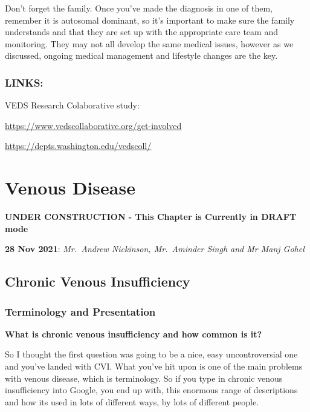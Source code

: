 \documentclass[
]{book}
\begin{document}
Don't forget the family. Once you've made the diagnosis in one of them,
remember it is autosomal dominant, so it's important to make sure the
family understands and that they are set up with the appropriate care
team and monitoring. They may not all develop the same medical issues,
however as we discussed, ongoing medical management and lifestyle
changes are the key.

\hypertarget{links}{%
\subsection{LINKS:}\label{links}}

VEDS Research Colaborative study:

\href{https://www.vedscollaborative.org/get-involved}{\uline{https://www.vedscollaborative.org/get-involved}}

\href{https://depts.washington.edu/vedscoll/}{\uline{https://depts.washington.edu/vedscoll/}}

\hypertarget{venous-disease}{%
\chapter{Venous Disease}\label{venous-disease}}

\textbf{UNDER CONSTRUCTION - This Chapter is Currently in DRAFT mode}

\textbf{28 Nov 2021}: \emph{Mr.~Andrew Nickinson, Mr.~Aminder Singh and Mr Manj
Gohel}

\hypertarget{chronic-venous-insufficiency}{%
\section{Chronic Venous Insufficiency}\label{chronic-venous-insufficiency}}

\hypertarget{terminology-and-presentation}{%
\subsection{Terminology and Presentation}\label{terminology-and-presentation}}

\textbf{What is chronic venous insufficiency and how common is it?}

So I thought the first question was going to be a nice, easy
uncontroversial one and you've landed with CVI. What you've hit upon is
one of the main problems with venous disease, which is terminology. So
if you type in chronic venous insufficiency into Google, you end up
with, this enormous range of descriptions and how its used in lots of
different ways, by lots of different people.
\end{document}
